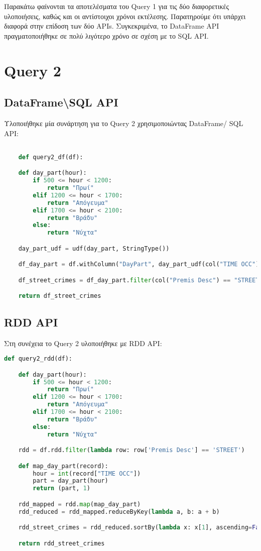 \documentclass{article}
\begin{document}
Παρακάτω φαίνονται τα αποτελέσματα του Query 1 για τις δύο διαφορετικές υλοποιήσεις, καθώς και οι αντίστοιχοι χρόνοι εκτέλεσης. Παρατηρούμε ότι υπάρχει διαφορά στην επίδοση των δύο APIs. Συγκεκριμένα, το DataFrame API πραγματοποιήθηκε σε πολύ λιγότερο χρόνο σε σχέση με το SQL API.

\section{Query 2}

\subsection*{DataFrame\textbackslash SQL  API}

Υλοποιήθηκε μία συνάρτηση για το Query 2 χρησιμοποιώντας DataFrame/ SQL API:

\begin{lstlisting}[language = Python]

    def query2_df(df):

    def day_part(hour):
        if 500 <= hour < 1200:
            return "Πρωί"
        elif 1200 <= hour < 1700:
            return "Απόγευμα"
        elif 1700 <= hour < 2100:
            return "Βράδυ"
        else:
            return "Νύχτα"

    day_part_udf = udf(day_part, StringType())

    df_day_part = df.withColumn("DayPart", day_part_udf(col("TIME OCC")))

    df_street_crimes = df_day_part.filter(col("Premis Desc") == "STREET").groupBy("DayPart").count().orderBy(col("count").desc())

    return df_street_crimes
\end{lstlisting}

\subsection*{RDD API}

Στη συνέχεια το Query 2 υλοποιήθηκε με RDD API:
\begin{lstlisting}[language = Python]
    def query2_rdd(df):

    def day_part(hour):
        if 500 <= hour < 1200:
            return "Πρωί"
        elif 1200 <= hour < 1700:
            return "Απόγευμα"
        elif 1700 <= hour < 2100:
            return "Βράδυ"
        else:
            return "Νύχτα"

    rdd = df.rdd.filter(lambda row: row['Premis Desc'] == 'STREET')

    def map_day_part(record):
        hour = int(record["TIME OCC"])
        part = day_part(hour)
        return (part, 1)

    rdd_mapped = rdd.map(map_day_part)
    rdd_reduced = rdd_mapped.reduceByKey(lambda a, b: a + b)

    rdd_street_crimes = rdd_reduced.sortBy(lambda x: x[1], ascending=False)

    return rdd_street_crimes 
\end{lstlisting}
\end{document}
